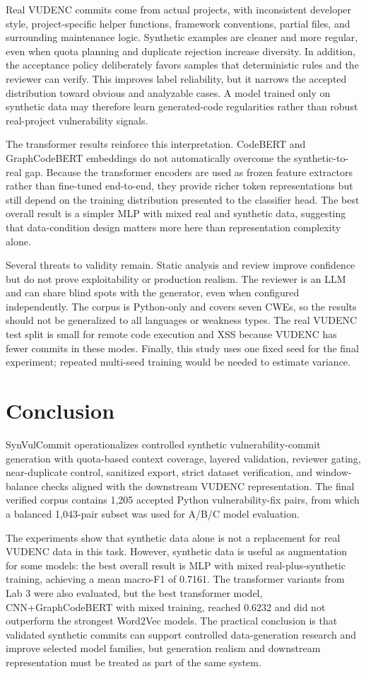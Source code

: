 Real VUDENC commits come from actual projects, with inconsistent developer style, project-specific helper functions, framework conventions, partial files, and surrounding maintenance logic. Synthetic examples are cleaner and more regular, even when quota planning and duplicate rejection increase diversity. In addition, the acceptance policy deliberately favors samples that deterministic rules and the reviewer can verify. This improves label reliability, but it narrows the accepted distribution toward obvious and analyzable cases. A model trained only on synthetic data may therefore learn generated-code regularities rather than robust real-project vulnerability signals.

The transformer results reinforce this interpretation. CodeBERT and GraphCodeBERT embeddings do not automatically overcome the synthetic-to-real gap. Because the transformer encoders are used as frozen feature extractors rather than fine-tuned end-to-end, they provide richer token representations but still depend on the training distribution presented to the classifier head. The best overall result is a simpler MLP with mixed real and synthetic data, suggesting that data-condition design matters more here than representation complexity alone.

Several threats to validity remain. Static analysis and review improve confidence but do not prove exploitability or production realism. The reviewer is an LLM and can share blind spots with the generator, even when configured independently. The corpus is Python-only and covers seven CWEs, so the results should not be generalized to all languages or weakness types. The real VUDENC test split is small for remote code execution and XSS because VUDENC has fewer commits in these modes. Finally, this study uses one fixed seed for the final experiment; repeated multi-seed training would be needed to estimate variance.

\section{Conclusion}
SynVulCommit operationalizes controlled synthetic vulnerability-commit generation with quota-based context coverage, layered validation, reviewer gating, near-duplicate control, sanitized export, strict dataset verification, and window-balance checks aligned with the downstream VUDENC representation. The final verified corpus contains 1,205 accepted Python vulnerability-fix pairs, from which a balanced 1,043-pair subset was used for A/B/C model evaluation.

The experiments show that synthetic data alone is not a replacement for real VUDENC data in this task. However, synthetic data is useful as augmentation for some models: the best overall result is MLP with mixed real-plus-synthetic training, achieving a mean macro-F1 of 0.7161. The transformer variants from Lab 3 were also evaluated, but the best transformer model, CNN+GraphCodeBERT with mixed training, reached 0.6232 and did not outperform the strongest Word2Vec models. The practical conclusion is that validated synthetic commits can support controlled data-generation research and improve selected model families, but generation realism and downstream representation must be treated as part of the same system.

